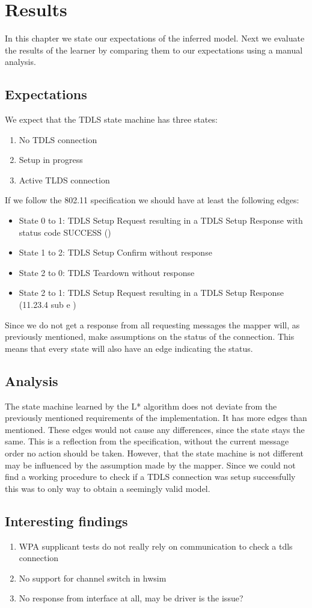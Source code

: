 \chapter{Results}

In this chapter we state our expectations of the inferred model. Next we evaluate the results of the learner by comparing them to our expectations using a manual analysis.

\section{Expectations}

We expect that the TDLS state machine has three states:
\begin{enumerate}
	\item No TDLS connection
	\item Setup in progress
	\item Active TLDS connection
\end{enumerate}

If we follow the 802.11 specification we should have at least the following edges:
\begin{itemize}
	\item State 0 to 1: TDLS Setup Request resulting in a TDLS Setup Response with status code SUCCESS (\cite[11.23.4]{80211})
	\item State 1 to 2: TDLS Setup Confirm without response
	\item State 2 to 0: TDLS Teardown without response
	\item State 2 to 1: TDLS Setup Request resulting in a TDLS Setup Response (11.23.4 sub e \cite{80211})
\end{itemize}

Since we do not get a response from all requesting messages the mapper will, as previously mentioned, make assumptions on the status of the connection. This means that every state will also have an edge indicating the status.

\section{Analysis}

The state machine learned by the L* algorithm does not deviate from the previously mentioned requirements of the implementation. It has more edges than mentioned. These edges would not cause any differences, since the state stays the same. This is a reflection from the specification, without the current message order no action should be taken. However, that the state machine is not different may be influenced by the assumption made by the mapper. Since we could not find a working procedure to check if a TDLS connection was setup successfully this was to only way to obtain a seemingly valid model.

\section{Interesting findings}

\begin{enumerate}
	\item WPA supplicant tests do not really rely on communication to check a tdls connection
	\item No support for channel switch in hwsim
	\item No response from interface at all, may be driver is the issue?
\end{enumerate}
